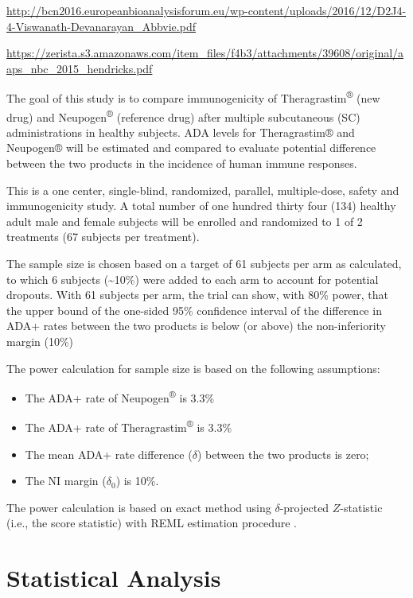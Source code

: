 \documentclass[]{book}
\providecommand{\tightlist}{%
  \setlength{\itemsep}{0pt}\setlength{\parskip}{0pt}}
\begin{document}
\url{http://bcn2016.europeanbioanalysisforum.eu/wp-content/uploads/2016/12/D2J4-4-Viswanath-Devanarayan_Abbvie.pdf}

\url{https://zerista.s3.amazonaws.com/item_files/f4b3/attachments/39608/original/aaps_nbc_2015_hendricks.pdf}

The goal of this study is to compare immunogenicity of
Theragrastim\textsuperscript{®} (new drug) and
Neupogen\textsuperscript{®} (reference drug) after multiple subcutaneous
(SC) administrations in healthy subjects. ADA levels for Theragrastim®
and Neupogen® will be estimated and compared to evaluate potential
difference between the two products in the incidence of human immune
responses.

This is a one center, single-blind, randomized, parallel, multiple-dose,
safety and immunogenicity study. A total number of one hundred thirty
four (134) healthy adult male and female subjects will be enrolled and
randomized to 1 of 2 treatments (67 subjects per treatment).

The sample size is chosen based on a target of 61 subjects per arm as
calculated, to which 6 subjects (\textasciitilde{}10\%) were added to
each arm to account for potential dropouts. With 61 subjects per arm,
the trial can show, with 80\% power, that the upper bound of the
one-sided 95\% confidence interval of the difference in ADA+ rates
between the two products is below (or above) the non-inferiority margin
(10\%)

The power calculation for sample size is based on the following
assumptions:

\begin{itemize}
\tightlist
\item
  The ADA+ rate of Neupogen\textsuperscript{®} is 3.3\%
\item
  The ADA+ rate of Theragrastim\textsuperscript{®} is 3.3\%
\item
  The mean ADA+ rate difference (\(\delta\)) between the two products is
  zero;
\item
  The NI margin (\(\delta_0\)) is 10\%.
\end{itemize}

The power calculation is based on exact method \citep{chan1999test}
using \(\delta\)-projected \(Z\)-statistic (i.e., the score statistic)
with REML estimation procedure \citep{miettinen1985comparative}.

\section{Statistical Analysis}\label{statistical-analysis}
\end{document}
